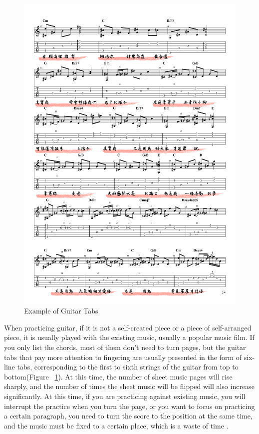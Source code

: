 \documentclass[10pt,twocolumn,letterpaper]{article}
\begin{document}
\begin{CJK}{UTF8}{bsmi}
\begin{figure}[t]
\begin{center}
   \includegraphics[width=0.8\linewidth]{2.png}
\end{center}
   \caption{Example of Guitar Tabs}
\label{fig:long}
\label{fig:guitar}
\end{figure}

When practicing guitar, if it is not a self-created piece or a piece of self-arranged piece, it is usually played with the existing music, usually a popular music film. If you only list the chords, most of them don’t need to turn pages, but the guitar tabs that pay more attention to fingering are usually presented in the form of six-line tabs, corresponding to the first to sixth strings of the guitar from top to bottom(Figure ~\ref{fig:guitar}). At this time, the number of sheet music pages will rise sharply, and the number of times the sheet music will be flipped will also increase significantly. At this time, if you are practicing against existing music, you will interrupt the practice when you turn the page, or you want to focus on practicing a certain paragraph, you need to turn the score to the position at the same time, and the music must be fixed to a certain place, which is a waste of time .




\end{CJK}
\end{document}
